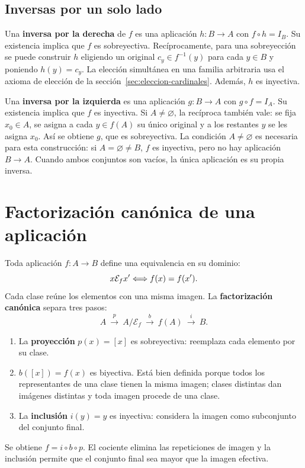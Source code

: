 \subsection*{Inversas por un solo lado}

Una \textbf{inversa por la derecha} de $f$ es una aplicación
$h\colon B\to A$ con $f\circ h=I_B$.
Su existencia implica que $f$ es sobreyectiva.
Recíprocamente, para una sobreyección se puede construir $h$ eligiendo
un original $c_y\in f^{-1}(y)$ para cada $y\in B$ y poniendo $h(y)=c_y$.
La elección simultánea en una familia arbitraria usa el axioma de elección
de la sección~\ref{sec:eleccion-cardinales}. Además, $h$ es inyectiva.

Una \textbf{inversa por la izquierda} es una aplicación
$g\colon B\to A$ con $g\circ f=I_A$.
Su existencia implica que $f$ es inyectiva.
Si $A\ne\varnothing$, la recíproca también vale: se fija $x_0\in A$,
se asigna a cada $y\in f(A)$ su único original y a los restantes $y$
se les asigna $x_0$. Así se obtiene $g$, que es sobreyectiva.
La condición $A\ne\varnothing$ es necesaria para esta construcción:
si $A=\varnothing\ne B$, $f$ es inyectiva, pero no hay aplicación $B\to A$.
Cuando ambos conjuntos son vacíos, la única aplicación es su propia inversa.

\newpage
\section{Factorización canónica de una aplicación}
\label{sec:factorizacion}

Toda aplicación $f\colon A\to B$ define una equivalencia en su dominio:
\[
 x\mathcal E_f x'\Longleftrightarrow f(x)=f(x').
\]
Cada clase reúne los elementos con una misma imagen.
La \textbf{factorización canónica} separa tres pasos:
\[
 A\ \xrightarrow{\ p\ }\ A/\mathcal E_f
   \ \xrightarrow{\ b\ }\ f(A)
   \ \xrightarrow{\ i\ }\ B.
\]
\begin{enumerate}
 \item La \textbf{proyección} $p(x)=[x]$ es sobreyectiva:
       reemplaza cada elemento por su clase.
 \item $b([x])=f(x)$ es biyectiva. Está bien definida porque
       todos los representantes de una clase tienen la misma imagen;
       clases distintas dan imágenes distintas y toda imagen procede
       de una clase.
 \item La \textbf{inclusión} $i(y)=y$ es inyectiva:
       considera la imagen como subconjunto del conjunto final.
\end{enumerate}
Se obtiene $f=i\circ b\circ p$. El cociente elimina las repeticiones
de imagen y la inclusión permite que el conjunto final sea mayor
que la imagen efectiva.

